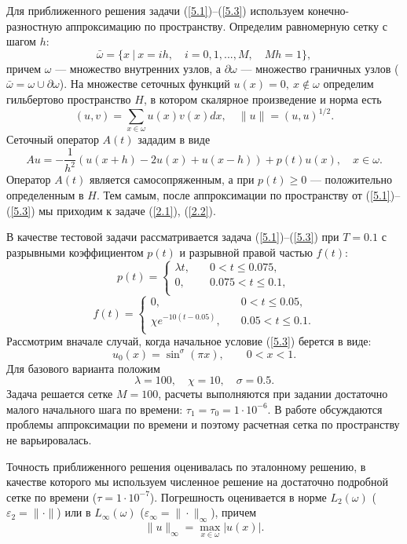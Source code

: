 \documentclass[12pt]{ncc}
\numberwithin{equation}{section}
\begin{document}
Для приближенного решения задачи  (\ref{5.1})--(\ref{5.3})
используем конечно-разностную аппроксимацию по пространству.
Определим равномерную сетку с шагом $h$:
\[
  \bar{\omega} = \{ x \ | \ x = ih, \quad i = 0, 1, ..., M, \quad Mh = 1 \},  
\] 
причем $\omega$ --- множество внутренних узлов, а $\partial \omega$ --- множество граничных
узлов ($\bar{\omega } = \omega \cup \partial \omega$).
На множестве сеточных функций $u(x) = 0, \ x \notin \omega$ определим
гильбертово пространство $H$, в котором скалярное произведение и норма есть
\[
 (u,v) = \sum_{x \in \omega} u(x) v(x) dx,
 \quad \|u\| = (u,u)^{1/2} . 
\]   
Сеточный оператор $A(t)$ зададим в виде
\[
 A u = - \frac{1}{h^2} (u(x+h) - 2 u(x) + u(x-h)) + p(t) u(x),
 \quad x \in \omega . 
\] 
Оператор $A(t)$ является самосопряженным, а при $p(t) \geq 0$ --- положительно определенным в $H$.
Тем самым, после аппроксимации по пространству от  (\ref{5.1})--(\ref{5.3}) мы приходим
к задаче (\ref{2.1}), (\ref{2.2}).

В качестве тестовой задачи рассматривается задача  (\ref{5.1})--(\ref{5.3}) 
при $T = 0.1$  с разрывными коэффициентом $p(t)$ и разрывной правой частью $f(t)$:
\[
  p(t) = \left \{
  \begin{split}
  \lambda  t, & \quad 0 < t \leq 0.075, \\
  0, & \quad 0.075 < t \leq 0.1 , \\   
  \end{split}  
  \right . 
\]  
\[
  f(t) = \left \{
  \begin{split}
  0, & \quad 0 < t \leq 0.05, \\
  \chi  e^{-10 (t-0.05)}, & \quad 0.05 < t \leq 0.1 . \\   
  \end{split}  
  \right . 
\]
Рассмотрим вначале случай, когда начальное условие (\ref{5.3}) берется в виде:
\[
  u_0(x) = \sin^\sigma (\pi x),
  \quad  \quad 0 <  x <  1 .
\] 
Для базового варианта положим
\[
 \lambda = 100,
 \quad \chi = 10, 
 \quad \sigma = 0.5 . 
\] 
Задача решается сетке $M = 100$, расчеты выполняются при задании достаточно малого начального шага по времени:
$\tau_1 = \tau_0 = 1 \cdot 10^{-6}$. В работе обсуждаются проблемы аппроксимации по времени
и поэтому расчетная сетка по пространству не варьировалась.

Точность приближенного решения оценивалась по эталонному решению, в качестве которого
мы используем численное решение на достаточно подробной сетке по времени ($\tau = 1 \cdot 10^{-7}$).
Погрешность оценивается в норме $L_2(\omega)$ ($\varepsilon_2 = \|\cdot\|$) или в 
$L_\infty (\omega)$ ($\varepsilon_\infty  = \|\cdot\|_\infty$), причем
\[
 \|u\|_\infty = \max_{x \in \omega} |u(x)| .
\] 
\end{document}
